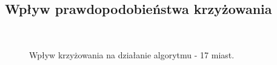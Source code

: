 \documentclass[12pt, a4paper]{article}
\begin{document}
\subsection{Wpływ prawdopodobieństwa krzyżowania}
\begin{figure}[H]
\centering
\mbox{\quad
{} 
}
\caption{Wpływ krzyżowania na działanie algorytmu - 17 miast.}
\end{figure}
\end{document}
